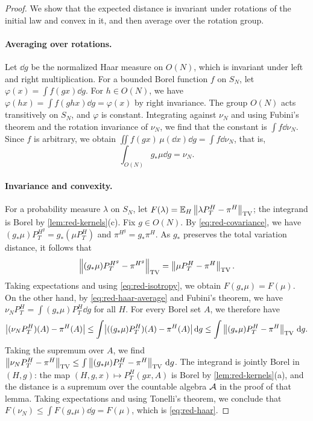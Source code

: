 \begin{proof}
We show that the expected distance is invariant under rotations of the initial law and convex in it, and then average over the rotation group.

\paragraph{Averaging over rotations.}
Let $\dd g$ be the normalized Haar measure on $O(N)$, which is invariant under left and right multiplication. For a bounded Borel function $f$ on $S_N$, let $\varphi(x)=\int f(gx)\dd g$. For $h\in O(N)$, we have $\varphi(hx)=\int f(ghx)\dd g=\varphi(x)$ by right invariance. The group $O(N)$ acts transitively on $S_N$, and $\varphi$ is constant. Integrating against $\nu_N$ and using Fubini's theorem and the rotation invariance of $\nu_N$, we find that the constant is $\int f\dd\nu_N$. Since $f$ is arbitrary, we obtain $\iint f(gx)\,\mu(\dd x)\dd g=\int f\dd\nu_N$, that is,
\begin{equation}\label{eq:red-haar-average}
\int_{O(N)}g_*\mu\dd g=\nu_N.
\end{equation}

\paragraph{Invariance and convexity.}
For a probability measure $\lambda$ on $S_N$, let $F(\lambda)=\mathbb E_H\left\lVert\lambda P^H_T-\pi^H\right\rVert_{\mathrm{TV}}$; the integrand is Borel by \cref{lem:red-kernels}(c). Fix $g\in O(N)$. By \eqref{eq:red-covariance}, we have $(g_*\mu)P^{H^g}_T=g_*(\mu P^H_T)$ and $\pi^{H^g}=g_*\pi^H$. As $g_*$ preserves the total variation distance, it follows that
\begin{equation*}
\left\lVert(g_*\mu)P^{H^g}_T-\pi^{H^g}\right\rVert_{\mathrm{TV}}=\left\lVert\mu P^H_T-\pi^H\right\rVert_{\mathrm{TV}}.
\end{equation*}
Taking expectations and using \eqref{eq:red-isotropy}, we obtain $F(g_*\mu)=F(\mu)$. On the other hand, by \eqref{eq:red-haar-average} and Fubini's theorem, we have $\nu_NP^H_T=\int(g_*\mu)P^H_T\dd g$ for all $H$. For every Borel set $A$, we therefore have
\begin{equation*}
\bigl|(\nu_NP^H_T)(A)-\pi^H(A)\bigr|\le\int\bigl|((g_*\mu)P^H_T)(A)-\pi^H(A)\bigr|\,\mathrm d g\le\int\left\lVert(g_*\mu)P^H_T-\pi^H\right\rVert_{\mathrm{TV}}\,\mathrm d g.
\end{equation*}
Taking the supremum over $A$, we find $\left\lVert\nu_NP^H_T-\pi^H\right\rVert_{\mathrm{TV}}\le\int\left\lVert(g_*\mu)P^H_T-\pi^H\right\rVert_{\mathrm{TV}}\,\mathrm d g$. The integrand is jointly Borel in $(H,g)$: the map $(H,g,x)\mapsto P^H_T(gx,A)$ is Borel by \cref{lem:red-kernels}(a), and the distance is a supremum over the countable algebra $\mathcal A$ in the proof of that lemma. Taking expectations and using Tonelli's theorem, we conclude that $F(\nu_N)\le\int F(g_*\mu)\dd g=F(\mu)$, which is \eqref{eq:red-haar}.


\end{proof}
